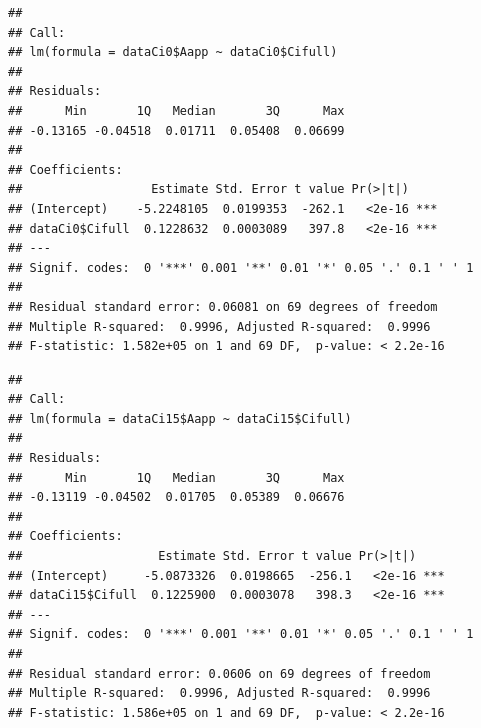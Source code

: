 \documentclass[
]{krantz}
\makeatletter
\newenvironment{Shaded}{\begin{snugshade}}{\end{snugshade}}
\newcommand{\DecValTok}[1]{\textcolor[rgb]{0.00,0.00,0.81}{#1}}
\newcommand{\KeywordTok}[1]{\textcolor[rgb]{0.13,0.29,0.53}{\textbf{#1}}}
\newcommand{\NormalTok}[1]{#1}
\newcommand{\OperatorTok}[1]{\textcolor[rgb]{0.81,0.36,0.00}{\textbf{#1}}}
\newcommand{\StringTok}[1]{\textcolor[rgb]{0.31,0.60,0.02}{#1}}
\newenvironment{kframe}{%
\medskip{}
\setlength{\fboxsep}{.8em}
 \def\at@end@of@kframe{}%
 \ifinner\ifhmode%
  \def\at@end@of@kframe{\end{minipage}}%
  \begin{minipage}{\columnwidth}%
 \fi\fi%
 \def\FrameCommand##1{\hskip\@totalleftmargin \hskip-\fboxsep
 \colorbox{shadecolor}{##1}\hskip-\fboxsep
     \hskip-\linewidth \hskip-\@totalleftmargin \hskip\columnwidth}%
 \MakeFramed {\advance\hsize-\width
   \@totalleftmargin\z@ \linewidth\hsize
   \@setminipage}}%
 {\par\unskip\endMakeFramed%
 \at@end@of@kframe}
\renewenvironment{Shaded}{\begin{kframe}}{\end{kframe}}
\makeatother
\begin{document}
\begin{verbatim}
## 
## Call:
## lm(formula = dataCi0$Aapp ~ dataCi0$Cifull)
## 
## Residuals:
##      Min       1Q   Median       3Q      Max 
## -0.13165 -0.04518  0.01711  0.05408  0.06699 
## 
## Coefficients:
##                  Estimate Std. Error t value Pr(>|t|)    
## (Intercept)    -5.2248105  0.0199353  -262.1   <2e-16 ***
## dataCi0$Cifull  0.1228632  0.0003089   397.8   <2e-16 ***
## ---
## Signif. codes:  0 '***' 0.001 '**' 0.01 '*' 0.05 '.' 0.1 ' ' 1
## 
## Residual standard error: 0.06081 on 69 degrees of freedom
## Multiple R-squared:  0.9996, Adjusted R-squared:  0.9996 
## F-statistic: 1.582e+05 on 1 and 69 DF,  p-value: < 2.2e-16
\end{verbatim}

\begin{Shaded}
\end{Shaded}

\begin{verbatim}
## 
## Call:
## lm(formula = dataCi15$Aapp ~ dataCi15$Cifull)
## 
## Residuals:
##      Min       1Q   Median       3Q      Max 
## -0.13119 -0.04502  0.01705  0.05389  0.06676 
## 
## Coefficients:
##                   Estimate Std. Error t value Pr(>|t|)    
## (Intercept)     -5.0873326  0.0198665  -256.1   <2e-16 ***
## dataCi15$Cifull  0.1225900  0.0003078   398.3   <2e-16 ***
## ---
## Signif. codes:  0 '***' 0.001 '**' 0.01 '*' 0.05 '.' 0.1 ' ' 1
## 
## Residual standard error: 0.0606 on 69 degrees of freedom
## Multiple R-squared:  0.9996, Adjusted R-squared:  0.9996 
## F-statistic: 1.586e+05 on 1 and 69 DF,  p-value: < 2.2e-16
\end{verbatim}

\begin{Shaded}
\end{Shaded}
\end{document}
